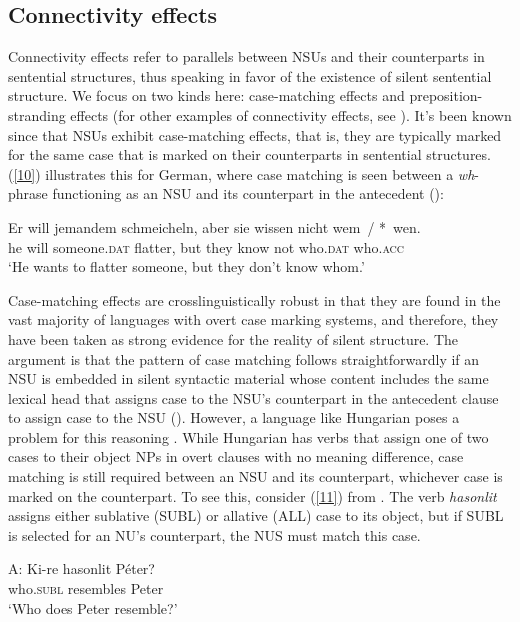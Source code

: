 {\subsection{Connectivity effects}
\label{sec-connectivity-effects}

Connectivity effects refer to parallels between NSUs and their counterparts in sentential structures, thus speaking in favor of the existence of silent sentential structure. We focus on two kinds here: case-matching effects and preposition-stranding effects (for other examples of connectivity effects, see \citealt{Ginzburg2018}). It's been known since \citet{Ross1967} that NSUs exhibit case-matching effects, that is, they are typically marked for the same case that is marked on their counterparts in sentential structures. (\ref{10}) illustrates this for German, where case matching is seen between a \emph{wh}-phrase functioning as an NSU and its counterpart in the antecedent (\citealt[663]{Merchant2005-proc}):

\ea
\gll Er will jemandem schmeicheln, aber sie wissen nicht wem~/ *~wen.\\
     he will someone.\textsc{dat} flatter, but they know not who.\textsc{dat}  who.\textsc{acc}\\
\glt `He wants to flatter someone, but they don't know whom.'\label{10}\z


Case-matching effects are crosslinguistically robust in that they are found in the vast majority of languages with overt case marking systems, and therefore, they have been taken as strong evidence for the reality of silent structure. The argument is that the pattern of case matching follows straightforwardly if an NSU is embedded in silent syntactic material whose content includes the same lexical head that assigns case to the NSU's counterpart in the antecedent clause to assign case to the NSU (\citealt{Merchant2001, Merchant2005a}). However, a language like Hungarian poses a problem for this reasoning \citep{Jacobson2016}. While Hungarian has verbs that assign one of two cases to their object NPs in overt clauses with no meaning difference, case matching is still required between an NSU and its counterpart, whichever case is marked on the counterpart. To see this, consider (\ref{11}) from \citet[356]{Jacobson2016}. The verb \emph{hasonlit} assigns either sublative (SUBL) or allative (ALL) case to its object, but if SUBL is selected for an NU's counterpart, the NUS must match this case.

\ea
A: \gll Ki-re hasonlit P\'{e}ter?\\
        who.\textsc{subl} resembles Peter\\
   \glt  `Who does Peter resemble?'\\

}
